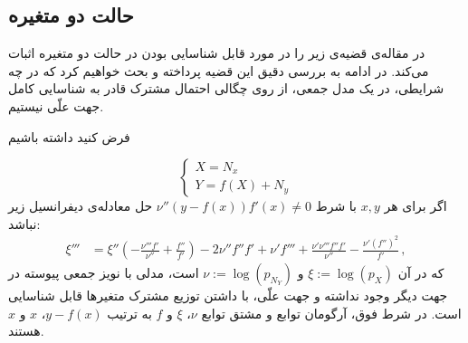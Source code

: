 \documentclass{article}
\begin{document}
\subsection{حالت دو متغیره}
در مقاله‌ی 
\cite{hoyer}
قضیه‌ی زیر را در مورد قابل شناسایی بودن 
در حالت دو متغیره اثبات می‌کند. در ادامه به بررسی دقیق این قضیه پرداخته و بحث خواهیم کرد که در چه شرایطی، در یک مدل جمعی، از روی چگالی احتمال مشترک قادر به شناسایی کامل جهت علّی نیستیم.
\begin{thm} \label{hoyer}
فرض کنید داشته باشیم

\begin{equation*}
\begin{cases}
X = N_x\\
Y = f(X) + N_y
\end{cases}
\end{equation*}
اگر برای هر 
$x, y$ 
با شرط
 $\nu''(y-f(x))f'(x)\neq 0$ 
  حل معادله‌ی دیفرانسیل زیر نباشد:
\begin{align}\label{DGL}
\xi'''&=   \xi''  \left(-\frac{\nu'''f'}{\nu''}
+\frac{f''}{f'}\right) 
-2 \nu''f''f' %
+\nu'f'''+\frac{\nu'\nu'''f''f'}{\nu''}-\frac{\nu'(f'')^2}{f'}\,,
\end{align}
که در آن 
$\xi := \log(p_X)$ 
و
$\nu := \log(p_{N_{Y}})$
است، مدلی با نویز جمعی پیوسته در جهت دیگر وجود نداشته و جهت علّی، با داشتن توزیع مشترک متغیر‌ها قابل شناسایی است. در شرط فوق، آرگومان توابع و مشتق توابع $\nu$، 
$\xi $
و $f$ به ترتیب 
$y-f(x)$،
$x$
و  
$x$
هستند.
\end{thm}
\end{document}
